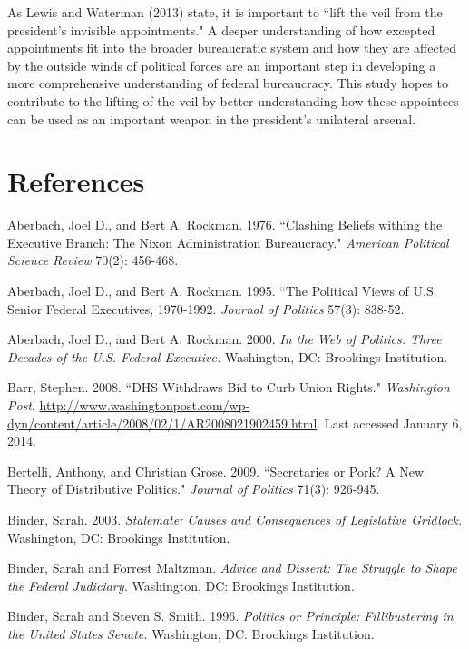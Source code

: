 \documentclass[12pt]{article}
\begin{document}
As Lewis and Waterman (2013) state, it is important to ``lift the veil from the president's invisible appointments." A deeper understanding of how excepted appointments fit into the broader bureaucratic system and how they are affected by the outside winds of political forces are an important step in developing a more comprehensive understanding of federal bureaucracy. This study hopes to contribute to the lifting of the veil by better understanding how these appointees can be used as an important weapon in the president's unilateral arsenal.

\newpage
\section*{References}
\singlespacing
\noindent \hangindent=0.7cm Aberbach, Joel D.,  and Bert A. Rockman. 1976. ``Clashing Beliefs withing the Executive Branch: The Nixon Administration Bureaucracy." \textit{American Political Science Review} 70(2): 456-468. 

\noindent \hangindent=0.7cm Aberbach, Joel D., and Bert A. Rockman. 1995. ``The Political Views of U.S. Senior Federal Executives, 1970-1992. \textit{Journal of Politics} 57(3): 838-52. 

\noindent \hangindent=0.7cm Aberbach, Joel D., and Bert A. Rockman. 2000. \textit{In the Web of Politics: Three Decades of the U.S. Federal Executive.} Washington, DC: Brookings Institution.

\noindent \hangindent=0.7cm Barr, Stephen. 2008. ``DHS Withdraws Bid to Curb Union Rights." \textit{Washington Post}. \url{http://www.washingtonpost.com/wp-dyn/content/article/2008/02/1/AR2008021902459.html}. Last accessed January 6, 2014.

\noindent \hangindent=0.7cm Bertelli, Anthony, and Christian Grose. 2009. ``Secretaries or Pork? A New Theory of Distributive Politics." \textit{Journal of Politics} 71(3): 926-945. 

\noindent \hangindent=0.7cm Binder, Sarah. 2003. \textit{Stalemate: Causes and Consequences of Legislative Gridlock.} Washington, DC: Brookings Institution.

\noindent \hangindent=0.7cm Binder, Sarah and Forrest Maltzman. \textit{Advice and Dissent: The Struggle to Shape the Federal Judiciary.} Washington, DC: Brookings Institution. 

\noindent \hangindent=0.7cm Binder, Sarah and Steven S. Smith. 1996. \textit{Politics or Principle: Fillibustering in the United States Senate.} Washington, DC: Brookings Institution. 
\end{document}
